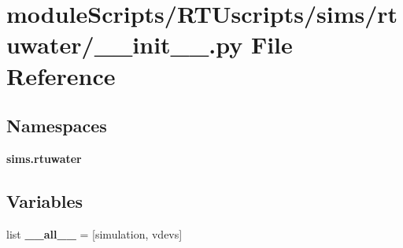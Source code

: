\section{module\+Scripts/\+R\+T\+Uscripts/sims/rtuwater/\+\_\+\+\_\+init\+\_\+\+\_\+.py File Reference}
\label{sims_2rtuwater_2____init_____8py}
\subsection*{Namespaces}
\begin{DoxyCompactItemize}
\item 
 {\bf sims.\+rtuwater}
\end{DoxyCompactItemize}
\subsection*{Variables}
\begin{DoxyCompactItemize}
\item 
list {\bf \+\_\+\+\_\+all\+\_\+\+\_\+} = [\textquotesingle{}simulation\textquotesingle{}, \textquotesingle{}vdevs\textquotesingle{}]
\end{DoxyCompactItemize}
